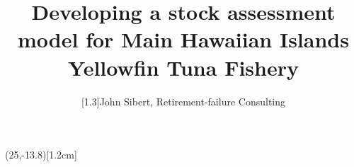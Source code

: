 \documentclass[a4paper,KOMA,landscape,titlepage]{powersem}
\begin{document}
\pageTransitionReplace
\pagecounter[on]


\freelogo(25,-13.8)[1.2cm] %



\author{\scalebox{1}[1.3]{John Sibert, Retirement-failure Consulting}} 
\title{Developing a stock assessment model for 
Main Hawaiian Islands Yellowfin Tuna Fishery}


\address{\href{mailto:sibert@hawaii.edu}{sibert@hawaii.edu}}

\begin{slide}
\maketitle
\end{slide}

\end{document}
